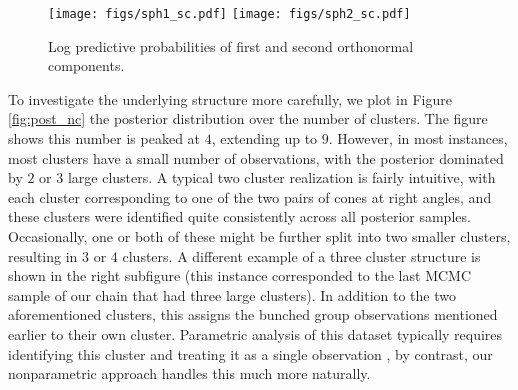   \begin{figure}
  \centering
    \texttt{[image: figs/sph1\_sc.pdf]}
  \centering
    \texttt{[image: figs/sph2\_sc.pdf]}
\caption{Log predictive probabilities of first and second orthonormal components.}
  \label{fig:samplers_clst}
  \end{figure}
To investigate the underlying structure more carefully, we plot in Figure \ref{fig:post_nc} the posterior distribution over the number of
clusters. %
The figure shows this number is peaked at $4$, extending up to $9$. However, in most instances, most clusters
have a  small number of observations, with the posterior dominated by $2$ or $3$ large clusters.
A typical two cluster realization is fairly intuitive, with
each cluster corresponding to one of the two pairs of cones at right angles, and these
clusters were identified quite consistently across all posterior samples.
Occasionally, one or both of these might be further split into two smaller clusters, resulting in $3$ or $4$
clusters. A different example of a three cluster structure is shown in the right subfigure (this instance corresponded to the last MCMC sample of our chain
that had three large clusters).
In addition to the two aforementioned clusters,
this assigns the bunched group observations mentioned earlier to their own cluster.
Parametric analysis of this dataset typically requires identifying this cluster and treating it as a single observation \citep{Sei2013440}, by contrast, our
nonparametric approach handles this much more naturally.

